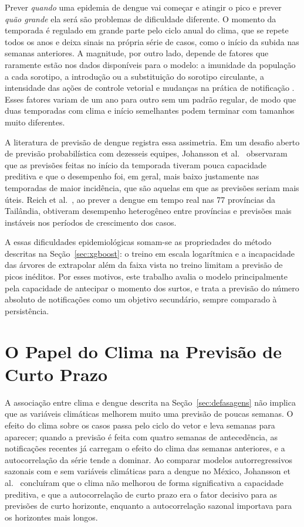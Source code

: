 Prever \textit{quando} uma epidemia de dengue vai começar e atingir o pico e prever \textit{quão grande} ela será são problemas de dificuldade diferente. O momento da temporada é regulado em grande parte pelo ciclo anual do clima, que se repete todos os anos e deixa sinais na própria série de casos, como o início da subida nas semanas anteriores. A magnitude, por outro lado, depende de fatores que raramente estão nos dados disponíveis para o modelo: a imunidade da população a cada sorotipo, a introdução ou a substituição do sorotipo circulante, a intensidade das ações de controle vetorial e mudanças na prática de notificação \cite{bhatt2013global,coelho2016assessing}. Esses fatores variam de um ano para outro sem um padrão regular, de modo que duas temporadas com clima e início semelhantes podem terminar com tamanhos muito diferentes.

A literatura de previsão de dengue registra essa assimetria. Em um desafio aberto de previsão probabilística com dezesseis equipes, Johansson et al.~\cite{johansson2019open} observaram que as previsões feitas no início da temporada tiveram pouca capacidade preditiva e que o desempenho foi, em geral, mais baixo justamente nas temporadas de maior incidência, que são aquelas em que as previsões seriam mais úteis. Reich et al.~\cite{reich2016challenges}, ao prever a dengue em tempo real nas 77 províncias da Tailândia, obtiveram desempenho heterogêneo entre províncias e previsões mais instáveis nos períodos de crescimento dos casos.

A essas dificuldades epidemiológicas somam-se as propriedades do método descritas na Seção~\ref{sec:xgboost}: o treino em escala logarítmica e a incapacidade das árvores de extrapolar além da faixa vista no treino limitam a previsão de picos inéditos. Por esses motivos, este trabalho avalia o modelo principalmente pela capacidade de antecipar o momento dos surtos, e trata a previsão do número absoluto de notificações como um objetivo secundário, sempre comparado à persistência.

\section{O Papel do Clima na Previsão de Curto Prazo}
\label{sec:ref_clima_curto_prazo}

A associação entre clima e dengue descrita na Seção~\ref{sec:defasagens} não implica que as variáveis climáticas melhorem muito uma previsão de poucas semanas. O efeito do clima sobre os casos passa pelo ciclo do vetor e leva semanas para aparecer; quando a previsão é feita com quatro semanas de antecedência, as notificações recentes já carregam o efeito do clima das semanas anteriores, e a autocorrelação da série tende a dominar. Ao comparar modelos autorregressivos sazonais com e sem variáveis climáticas para a dengue no México, Johansson et al.~\cite{johansson2016evaluating} concluíram que o clima não melhorou de forma significativa a capacidade preditiva, e que a autocorrelação de curto prazo era o fator decisivo para as previsões de curto horizonte, enquanto a autocorrelação sazonal importava para os horizontes mais longos.


